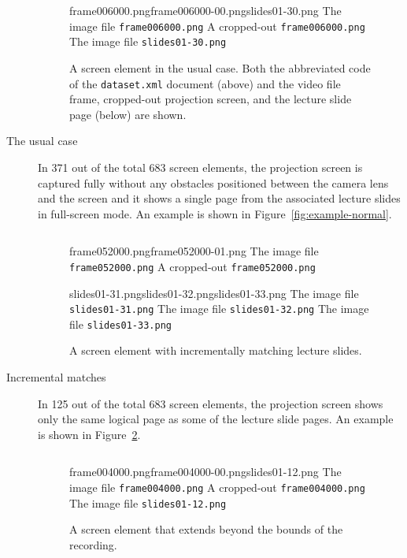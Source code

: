 \begin{description}
  \begin{figure}
    \inputminted{xml}{fig/examples/normal/example.xml}\par
      {frame006000.png}{frame006000-00.png}{slides01-30.png}%
      {The image file \texttt{frame006000.png}}%
      {A cropped-out \texttt{frame006000.png}}%
      {The image file \texttt{slides01-30.png}}
    \caption{A screen element in the usual case. Both the abbreviated code
      of the \texttt{dataset.xml} document (above) and the video file frame,
      cropped-out projection screen, and the lecture slide page (below) are
      shown.}
    \label{fig:example-normal}
    \label{fig:example-first}
  \end{figure}
  \item[The usual case] In 371 out of the total 683 screen elements, the
    projection screen is captured fully without any obstacles positioned
    between the camera lens and the screen and it shows a single page from the
    associated lecture slides in full-screen mode. An example is shown in
    Figure~\ref{fig:example-normal}.

  \begin{figure}
    \inputminted{xml}{fig/examples/incremental/example.xml}\par
      {frame052000.png}{frame052000-01.png}%
      {The image file \texttt{frame052000.png}}%
      {A cropped-out \texttt{frame052000.png}}\par
      {slides01-31.png}{slides01-32.png}{slides01-33.png}%
      {The image file \texttt{slides01-31.png}}%
      {The image file \texttt{slides01-32.png}}%
      {The image file \texttt{slides01-33.png}}
    \caption{A screen element with incrementally matching lecture slides.}
    \label{fig:example-incremental}
  \end{figure}
  \item[Incremental matches] In 125 out of the total 683 screen elements,
    the projection screen shows only the same logical page as some of the
    lecture slide pages. An example is shown in
    Figure~\ref{fig:example-incremental}.

  \begin{figure}
    \inputminted{xml}{fig/examples/beyond-bounds/example.xml}\par
      {frame004000.png}{frame004000-00.png}{slides01-12.png}%
      {The image file \texttt{frame004000.png}}%
      {A cropped-out \texttt{frame004000.png}}%
      {The image file \texttt{slides01-12.png}}
    \caption{A screen element that extends beyond the bounds of the recording.}
    \label{fig:example-beyond-bounds}


\end{figure}
\end{description}
